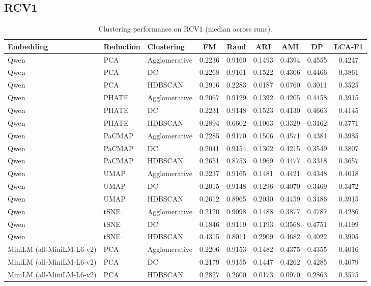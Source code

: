 \subsection{RCV1}
\begin{table}[t]
\centering
\caption{Clustering performance on RCV1 (median across runs).}
\begin{tabular}{lllcccccc}
\toprule
Embedding & Reduction & Clustering & FM & Rand & ARI & AMI & DP & LCA-F1 \\
\midrule

Qwen & PCA & Agglomerative & 0.2236 & 0.9160 & 0.1493 & 0.4394 & 0.4555 & 0.4247 \\
Qwen & PCA & DC & 0.2268 & 0.9161 & 0.1522 & 0.4306 & 0.4466 & 0.3861 \\
Qwen & PCA & HDBSCAN & 0.2916 & 0.2283 & 0.0187 & 0.0760 & 0.3011 & 0.3525 \\

Qwen & PHATE & Agglomerative & 0.2067 & 0.9129 & 0.1392 & 0.4205 & 0.4458 & 0.3915 \\
Qwen & PHATE & DC & 0.2231 & 0.9148 & 0.1523 & 0.4130 & 0.4663 & 0.4145 \\
Qwen & PHATE & HDBSCAN & 0.2894 & 0.6602 & 0.1063 & 0.3329 & 0.3162 & 0.3771 \\

Qwen & PaCMAP & Agglomerative & 0.2285 & 0.9170 & 0.1506 & 0.4571 & 0.4381 & 0.3985 \\
Qwen & PaCMAP & DC & 0.2041 & 0.9154 & 0.1302 & 0.4215 & 0.3549 & 0.3807 \\
Qwen & PaCMAP & HDBSCAN & 0.2651 & 0.8753 & 0.1969 & 0.4477 & 0.3318 & 0.3657 \\

Qwen & UMAP & Agglomerative & 0.2237 & 0.9165 & 0.1481 & 0.4421 & 0.4348 & 0.4018 \\
Qwen & UMAP & DC & 0.2015 & 0.9148 & 0.1296 & 0.4070 & 0.3469 & 0.3472 \\
Qwen & UMAP & HDBSCAN & 0.2612 & 0.8965 & 0.2030 & 0.4459 & 0.3486 & 0.3915 \\

Qwen & tSNE & Agglomerative & 0.2120 & 0.9098 & 0.1488 & 0.3877 & 0.4787 & 0.4286 \\
Qwen & tSNE & DC & 0.1846 & 0.9119 & 0.1193 & 0.3568 & 0.4751 & 0.4199 \\
Qwen & tSNE & HDBSCAN & 0.4315 & 0.8011 & 0.2909 & 0.4682 & 0.4022 & 0.3905 \\

MiniLM (all-MiniLM-L6-v2) & PCA & Agglomerative & 0.2206 & 0.9153 & 0.1482 & 0.4375 & 0.4355 & 0.4016 \\
MiniLM (all-MiniLM-L6-v2) & PCA & DC & 0.2179 & 0.9155 & 0.1447 & 0.4262 & 0.4285 & 0.4079 \\
MiniLM (all-MiniLM-L6-v2) & PCA & HDBSCAN & 0.2827 & 0.2600 & 0.0173 & 0.0970 & 0.2863 & 0.3575 \\


\end{tabular}
\end{table}

